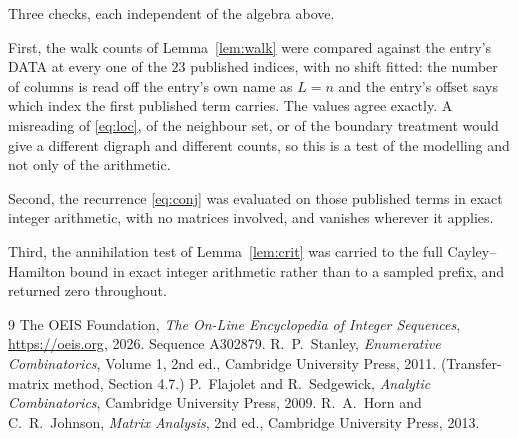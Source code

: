 \documentclass[11pt,a4paper]{article}
\theoremstyle{plain}
\theoremstyle{definition}
\begin{document}
Three checks, each independent of the algebra above.

First, the walk counts of Lemma~\ref{lem:walk} were compared against the entry's DATA at
every one of the $23$ published indices, with no shift fitted: the number of columns is
read off the entry's own name as $L=n$ and the entry's offset says which index the first
published term carries. The values agree exactly. A misreading of \eqref{eq:loc}, of the
neighbour set, or of the boundary treatment would give a different digraph and different
counts, so this is a test of the modelling and not only of the arithmetic.

Second, the recurrence \eqref{eq:conj} was evaluated on those published terms in exact
integer arithmetic, with no matrices involved, and vanishes wherever it applies.

Third, the annihilation test of Lemma~\ref{lem:crit} was carried to the full
Cayley--Hamilton bound in exact integer arithmetic rather than to a sampled prefix, and
returned zero throughout.

\begin{thebibliography}{9}
 The OEIS Foundation, \emph{The On-Line Encyclopedia of Integer
Sequences}, \url{https://oeis.org}, 2026. Sequence A302879.
 R.~P.~Stanley, \emph{Enumerative Combinatorics}, Volume 1, 2nd ed.,
Cambridge University Press, 2011. (Transfer-matrix method, Section 4.7.)
 P.~Flajolet and R.~Sedgewick, \emph{Analytic Combinatorics}, Cambridge
University Press, 2009.
 R.~A.~Horn and C.~R.~Johnson, \emph{Matrix Analysis}, 2nd ed., Cambridge
University Press, 2013.
\end{thebibliography}
\end{document}

